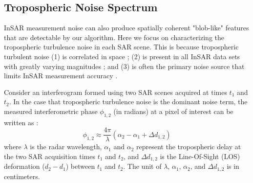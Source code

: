 \documentclass{utexasthesis}
\begin{document}
	
	
\subsection{Tropospheric Noise Spectrum}
\label{subsec:methods-2-tropo-spectrum}
InSAR measurement noise can also produce spatially coherent "blob-like" features that are detectable by our algorithm.  Here we focus on characterizing the tropospheric turbulence noise in each SAR scene. This is because tropospheric turbulent noise (1) is correlated in space \cite{Emardson2003NeutralAtmosphericDelay, Lohman2005SomeThoughtsUse}; (2) is present in all InSAR data sets with greatly varying magnitudes \cite{Barnhart2013CharacterizingEstimatingNoise, Hooper2012RecentAdvancesSar}; and (3) is often the primary noise source that limits InSAR measurement accuracy \cite{Jolivet2014ImprovingInsarGeodesy, Bekaert2015StatisticalComparisonInsar, Parker2015SystematicAssessmentAtmospheric}.


Consider an interferogram formed using two SAR scenes acquired at times $t_1$ and $t_2$. In the case that tropospheric turbulence noise is the dominant noise term, the measured interferometric phase $\phi_{1,2}$ (in radians) at a pixel of interest can be written as \cite{Zebker1997AtmosphericEffectsInterferometric}:
\begin{equation}
	\phi_{1,2} \approx \frac{4 \pi}{\lambda} \left(\alpha_2 - \alpha_1 + \Delta d_{1,2} \right)
\end{equation}
where $ \lambda $ is the radar wavelength, $\alpha_1$ and $\alpha_2$ represent the tropospheric delay at the two SAR acquisition times $t_1$ and $t_2$, and $\Delta d_{1,2} $ is the Line-Of-Sight (LOS) deformation ($d_2-d_1$) between $t_1$ and $t_2$. The unit of $\lambda$, $\alpha_1$, $\alpha_2$, and $\Delta d_{1,2} $ is in centimeters. 
\end{document}
